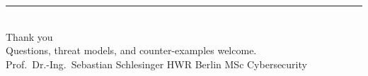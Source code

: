 \documentclass[aspectratio=169,10pt]{beamer}
\begin{document}
\begin{frame}
  \vfill\centering
  {\color{awsorange}\rule{0.16\paperwidth}{2.2pt}}\\[0.8em]
  {\color{awsink}Thank you}\\[0.4em]
  {\color{midgray}\small Questions, threat models, and counter-examples welcome.}\\[1.0em]
  {\footnotesize\color{midgray}Prof.\ Dr.-Ing.\ Sebastian Schlesinger {\color{awsorange}\textbullet}
   HWR Berlin {\color{awsorange}\textbullet} MSc Cybersecurity}
  \vfill
\end{frame}
\end{document}
